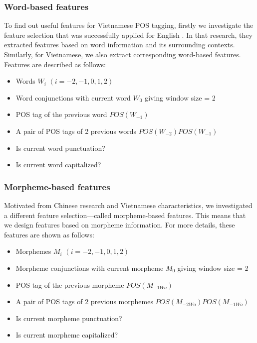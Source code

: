 \documentclass[english]{jnlp_1.4}
\begin{document}
\subsubsection{Word-based features}

To find out useful features for Vietnamese POS tagging, 
\pagebreak
firstly we investigate the feature selection that was successfully applied for English \cite{Ratnaparkhi97}. In that research, they extracted features based on word information and its surrounding contexts. Similarly, for Vietnamese, we also extract corresponding word-based features. Features are described as follows:

\begin{itemize}
  \item Words $W_{i}$ $(i = -2,-1,0,1,2)$
  \item Word conjunctions with current word $W_{0}$ giving window size = 2
  \item POS tag of the previous word $POS(W_{-1})$
  \item A pair of POS tags of 2 previous words $POS(W_{-2}) POS(W_{-1})$
  \item Is current word punctuation?
  \item Is current word capitalized?
\end{itemize}


\subsubsection{Morpheme-based features}

 Motivated from Chinese research \cite{Ng_Low04} and Vietnamese characteristics, we investigated a different feature selection---called morpheme-based features. This means that we design features based on morpheme information.
 For more details, these features are shown as follows:
\begin{itemize}
  \item Morphemes $M_{i}$ $(i = -2,-1,0,1,2)$
  \item Morpheme conjunctions with current morpheme $M_{0}$ giving window size = 2
  \item POS tag of the previous morpheme $POS(M_{-1Wo})$
  \item A pair of POS tags of 2 previous morphemes $POS(M_{-2Wo}) POS(M_{-1Wo})$
  \item Is current morpheme punctuation?
  \item Is current morpheme capitalized?
\end{itemize}
\end{document}
